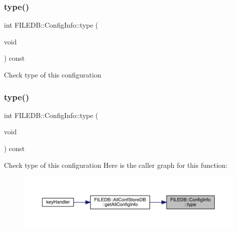 \mbox{\label{classFILEDB_1_1ConfigInfo_a8053fc6dd889fb1e7c888359412fc0c7}} 
\subsubsection{\texorpdfstring{type()}{type()}\hspace{0.1cm}{\footnotesize\ttfamily [1/4]}}
{\footnotesize\ttfamily int F\+I\+L\+E\+D\+B\+::\+Config\+Info\+::type (\begin{DoxyParamCaption}\item[{void}]{ }\end{DoxyParamCaption}) const}

Check type of this configuration \mbox{\label{classFILEDB_1_1ConfigInfo_a8053fc6dd889fb1e7c888359412fc0c7}} 
\subsubsection{\texorpdfstring{type()}{type()}\hspace{0.1cm}{\footnotesize\ttfamily [2/4]}}
{\footnotesize\ttfamily int F\+I\+L\+E\+D\+B\+::\+Config\+Info\+::type (\begin{DoxyParamCaption}\item[{void}]{ }\end{DoxyParamCaption}) const}

Check type of this configuration Here is the caller graph for this function\+:\nopagebreak
\begin{figure}[H]
\begin{center}
\leavevmode
\includegraphics[width=350pt]{d0/d90/classFILEDB_1_1ConfigInfo_a8053fc6dd889fb1e7c888359412fc0c7_icgraph}
\end{center}
\end{figure}
\mbox{\label{classFILEDB_1_1ConfigInfo_a8d65b3b00e90f7daa4ab65fae36ed024}} 
